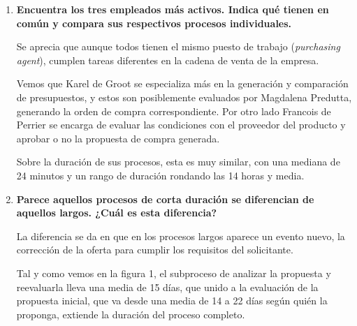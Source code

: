 \documentclass[13pt,a4paper]{article}
\begin{document}
    
    

    \newpage


\begin{enumerate}   
  \item \textbf{Encuentra los tres empleados más activos. Indica qué tienen en común y compara sus respectivos procesos individuales.}
  
  Se aprecia que aunque todos tienen el mismo puesto de trabajo (\textit{purchasing agent}), cumplen tareas diferentes en la cadena de venta de la empresa.

  Vemos que Karel de Groot se especializa más en la generación y comparación de presupuestos, y estos son posiblemente evaluados por Magdalena Predutta, generando la orden de compra correspondiente. Por otro lado Francois de Perrier se encarga de evaluar las condiciones con el proveedor del producto y aprobar o no la propuesta de compra generada.

  Sobre la duración de sus procesos, esta es muy similar, con una mediana de 24 minutos y un rango de duración rondando las 14 horas y media.

  \item \textbf{Parece aquellos procesos de corta duración se diferencian de aquellos largos. ¿Cuál es esta diferencia?}
  
  La diferencia se da en que en los procesos largos aparece un evento nuevo, la corrección de la oferta para cumplir los requisitos del solicitante.

  Tal y como vemos en la figura 1, el subproceso de analizar la propuesta y reevaluarla lleva una media de 15 días, que unido a la evaluación de la propuesta inicial, que va desde una media de 14 a 22 días según quién la proponga, extiende la duración del proceso completo.
\end{enumerate}
\end{document}
